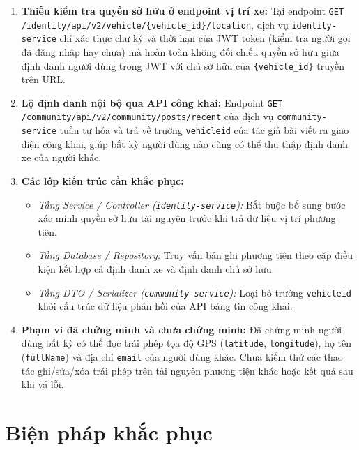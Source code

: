 \documentclass[11pt, a4paper]{article}
\begin{document}
\begin{enumerate}
    \item \textbf{Thiếu kiểm tra quyền sở hữu ở endpoint vị trí xe:} Tại endpoint \texttt{GET /identity/api/v2/vehicle/\{vehicle\_id\}/location}, dịch vụ \texttt{identity-service} chỉ xác thực chữ ký và thời hạn của JWT token (kiểm tra người gọi đã đăng nhập hay chưa) mà hoàn toàn không đối chiếu quyền sở hữu giữa định danh người dùng trong JWT với chủ sở hữu của \texttt{\{vehicle\_id\}} truyền trên URL.
    \item \textbf{Lộ định danh nội bộ qua API công khai:} Endpoint \texttt{GET /community/api/v2/community/posts/recent} của dịch vụ \texttt{community-service} tuần tự hóa và trả về trường \texttt{vehicleid} của tác giả bài viết ra giao diện công khai, giúp bất kỳ người dùng nào cũng có thể thu thập định danh xe của người khác.
    \item \textbf{Các lớp kiến trúc cần khắc phục:}
    \begin{itemize}
        \item \textit{Tầng Service / Controller (\texttt{identity-service}):} Bắt buộc bổ sung bước xác minh quyền sở hữu tài nguyên trước khi trả dữ liệu vị trí phương tiện.
        \item \textit{Tầng Database / Repository:} Truy vấn bản ghi phương tiện theo cặp điều kiện kết hợp cả định danh xe và định danh chủ sở hữu.
        \item \textit{Tầng DTO / Serializer (\texttt{community-service}):} Loại bỏ trường \texttt{vehicleid} khỏi cấu trúc dữ liệu phản hồi của API bảng tin công khai.
    \end{itemize}
    \item \textbf{Phạm vi đã chứng minh và chưa chứng minh:} Đã chứng minh người dùng bất kỳ có thể đọc trái phép tọa độ GPS (\texttt{latitude}, \texttt{longitude}), họ tên (\texttt{fullName}) và địa chỉ \texttt{email} của người dùng khác. Chưa kiểm thử các thao tác ghi/sửa/xóa trái phép trên tài nguyên phương tiện khác hoặc kết quả sau khi vá lỗi.
\end{enumerate}

\section{Biện pháp khắc phục}
\end{document}
